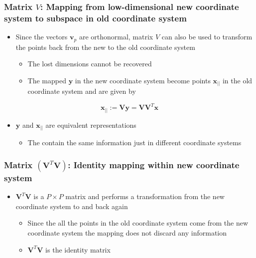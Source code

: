 \documentclass[11pt]{article}
\begin{document}
\subsubsection{Matrix \(V\): Mapping from low-dimensional new coordinate system to subspace in old coordinate system}
\label{sec:orga2ed33e}
\begin{itemize}
\item Since the vectors \(\pmb v_p\) are orthonormal, matrix \(V\) can also be used to transform the points back from the new to the old coordinate system
\begin{itemize}
\item The lost dimensions cannot be recovered
\item The mapped \(\pmb y\) in the new coordinate system become points \(\pmb x_{||}\) in the old coordinate system and are given by
\end{itemize}
\end{itemize}
\begin{equation}
  \pmb x_{||} := \pmb V \pmb y = \pmb V \pmb V^T \pmb x
\end{equation}
\begin{itemize}
\item \(\pmb y\) and \(\pmb x_{||}\) are equivalent representations
\begin{itemize}
\item The contain the same information just in different coordinate systems
\end{itemize}
\end{itemize}

\subsubsection{Matrix \((\pmb V^T \pmb V)\): Identity mapping within new coordinate system}
\label{sec:org7282bc1}
\begin{itemize}
\item \(\pmb V^T \pmb V\) is a \(P \times P\) matrix and performs a transformation from the new coordinate system to and back again
\begin{itemize}
\item Since the all the points in the old coordinate system come from the new coordinate system the mapping does not discard any information
\item \(\pmb V^T \pmb V\) is the identity matrix
\end{itemize}
\end{itemize}
\end{document}
